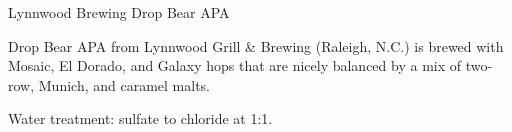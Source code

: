 \begin{recipie}{Lynnwood Brewing Drop Bear APA}

\begin{aboutblock}
Drop Bear APA from Lynnwood Grill \& Brewing (Raleigh, N.C.) is brewed with Mosaic,
El Dorado, and Galaxy hops that are nicely balanced by a mix of two-row, Munich,
and caramel malts.
\end{aboutblock}


\begin{methodandtiming}
 
\begin{mashsteps}
\end{mashsteps}

\begin{fermentationsteps}
\end{fermentationsteps}

\begin{directions}
Water treatment: sulfate to chloride at 1:1.
\end{directions}

\end{methodandtiming}

\pagebreak

\begin{ingredientsblock}

\begin{malts}
\end{malts}

\begin{hops}
\end{hops}

\begin{yeasts}
\end{yeasts}

\end{ingredientsblock}

\end{recipie}

